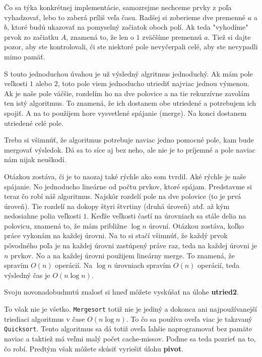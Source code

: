 Čo sa týka konkrétnej implementácie, samozrejme nechceme prvky z poľa vyhadzovať, lebo to zaberá
príliš veľa času. Radšej si zoberieme dve premenné $a$ a $b$, ktoré budú ukazovať na pomyselný
začiatok oboch polí. Ak teda "vyhodíme" prvok zo začiatku $A$, znamená to, že len o $1$ zväčšíme
premennú $a$. Tiež si dajte pozor, aby ste kontrolovali, či ste niektoré pole nevyčerpali celé, aby
ste nevypadli mimo pamäť.

S touto jednoduchou úvahou je už výsledný algritmus jednoduchý. Ak mám pole veľkosti $1$ alebo $2$,
toto pole viem jednoducho utriediť najviac jednou výmenou. Ak je naše pole väčšie, rozdelím ho na
dve polovice a na tie rekurzívne zavolám ten istý algoritmus. To znamená, že ich dostanem obe
utriedené a potrebujem ich spojiť. A na to použijem hore vysvetlené spájanie (merge). Na konci
dostanem utriedené celé pole.

Treba si všimnúť, že algoritmus potrebuje naviac jedno pomocné pole, kam bude mergovať výsledok. Dá
sa to síce aj bez neho, ale nie je to príjemné a pole naviac nám nijak neuškodí.

Otázkou zostáva, či je to naozaj také rýchle ako som tvrdil. Aké rýchle je naše spájanie. No
jednoducho lineárne od počtu prvkov, ktoré spájam. Predstavme si teraz čo robí náš algoritmus.
Najskôr rozdelí pole na dve polovice (to je prvá úroveň). Tie rozdelí na dokopy štyri štvrtiny
(druhá úroveň) atď. až kým nedosiahne polia veľkosti $1$. Keďže veľkosti časťí na úrovniach sa stále
delia na polovicu, znamená to, že mám približne $\log n$ úrovní. Otázkou zostáva, koľko práce
vykonám na každej úrovni. Na to si stačí všimnúť, že každý prvok pôvodného poľa je na každej úrovni
zastúpený práve raz, teda na každej úrovni je $n$ prvkov. No a na každej úrovni použijem lineárny
merge. To znamená, že spravím $O(n)$ operácií. Na $\log n$ úrovniach spravím $O(n)$ operácií, teda
výsledný čas je $O(n \log n)$.

\medskip

Svoju novonadobudnutú znalosť si hneď môžete vyskúšať na úlohe \textbf{utried2}.

\medskip

To však nie je všetko. \texttt{Mergesort} totiž nie je jediný a dokonca ani najpoužívanejší
triediaci algoritmus v čase $O(n \log n)$. To čo sa používa oveľa viac je takzvaný
\texttt{Quicksort}. Tento algoritmus sa dá totiž oveľa ľahšie naprogramovať bez pamäte naviac a
taktiež má veľmi malý počet cache-missov. Poďme sa teda pozrieť na to, čo robí. Predtým však môžete
skúsiť vyriešiť úlohu \textbf{pivot}.

